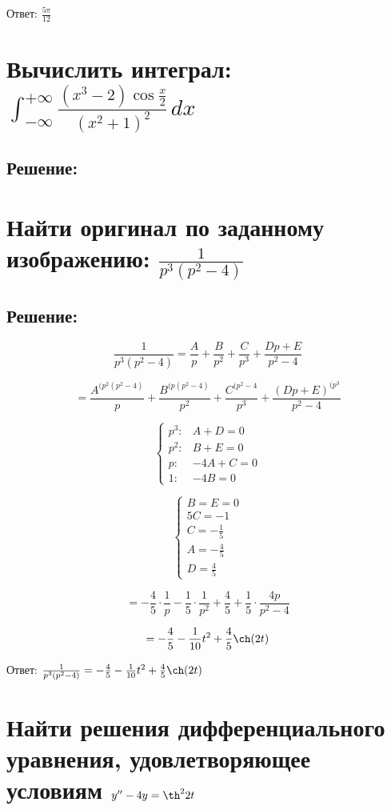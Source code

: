 \documentclass{article}
\begin{document}
Ответ: $\frac{5\pi}{12}$


\section{Вычислить интеграл: $\int_{-\infty}^{+\infty} \frac{(x^3 - 2) \cos \frac{x}{2}}{(x^2 + 1)^2} \, dx$}
\subsection{Решение:}

\section{Найти оригинал по заданному изображению: $\frac{1}{p^3 (p^2 - 4)}$}
\subsection{Решение:}

\[
\frac{1}{p^3 (p^2 - 4)} = \frac{A}{p} + \frac{B}{p^2} + \frac{C}{p^3} + \frac{Dp + E}{p^2 - 4}
\]

\[
= \frac{A^{(p^2(p^2-4)}}{p} + \frac{B^{(p(p^2-4)}}{p^2} + \frac{C^{(p^2-4}}{p^3} + \frac{(Dp + E)^{(p^3}}{p^2 - 4}
\]

\[
\begin{cases}
    p^3: & A + D = 0 \\
    p^2: & B + E = 0 \\
    p: & -4A + C = 0 \\
    1: & -4B = 0
\end{cases}
\]

\[
\begin{cases}
    B = E = 0 \\
    5C = -1 \\
    C = -\frac{1}{5} \\
    A = - \frac{4}{5} \\
    D = \frac{4}{5}
\end{cases}
\]

\[
= -\frac{4}{5} \cdot \frac{1}{p} - \frac{1}{5} \cdot \frac{1}{p^2} + \frac{4}{5} + \frac{1}{5} \cdot \frac{4p}{p^2 - 4}
\]

\[
= -\frac{4}{5} - \frac{1}{10} t^2 + \frac{4}{5} \ch (2t)
\]



Ответ:
$
\frac{1}{p^3 (p^2 - 4)}  = -\frac{4}{5} - \frac{1}{10} t^2 + \frac{4}{5} \ch (2t)
$

\section{Найти решения дифференциального уравнения, удовлетворяющее условиям $y'' - 4y = \th^2 2t$}
\end{document}
